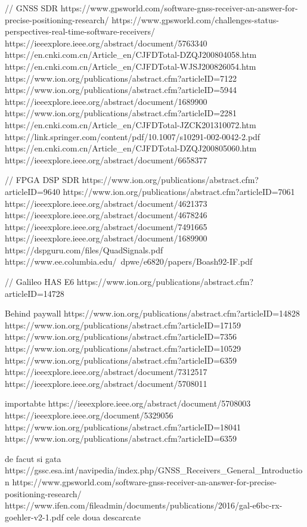 // GNSS SDR
https://www.gpsworld.com/software-gnss-receiver-an-answer-for-precise-positioning-research/
https://www.gpsworld.com/challenges-status-perspectives-real-time-software-receivers/
https://ieeexplore.ieee.org/abstract/document/5763340
https://en.cnki.com.cn/Article_en/CJFDTotal-DZQJ200804058.htm
https://en.cnki.com.cn/Article_en/CJFDTotal-WJSJ200826054.htm
https://www.ion.org/publications/abstract.cfm?articleID=7122
https://www.ion.org/publications/abstract.cfm?articleID=5944
https://ieeexplore.ieee.org/abstract/document/1689900
https://www.ion.org/publications/abstract.cfm?articleID=2281
https://en.cnki.com.cn/Article_en/CJFDTotal-JZCK201310072.htm
https://link.springer.com/content/pdf/10.1007/s10291-002-0042-2.pdf
https://en.cnki.com.cn/Article_en/CJFDTotal-DZQJ200805060.htm
https://ieeexplore.ieee.org/abstract/document/6658377


// FPGA DSP SDR
https://www.ion.org/publications/abstract.cfm?articleID=9640
https://www.ion.org/publications/abstract.cfm?articleID=7061
https://ieeexplore.ieee.org/abstract/document/4621373
https://ieeexplore.ieee.org/abstract/document/4678246
https://ieeexplore.ieee.org/abstract/document/7491665
https://ieeexplore.ieee.org/abstract/document/1689900
https://dspguru.com/files/QuadSignals.pdf
https://www.ee.columbia.edu/~dpwe/e6820/papers/Boash92-IF.pdf


// Galileo HAS E6
https://www.ion.org/publications/abstract.cfm?articleID=14728

Behind paywall
https://www.ion.org/publications/abstract.cfm?articleID=14828
https://www.ion.org/publications/abstract.cfm?articleID=17159
https://www.ion.org/publications/abstract.cfm?articleID=7356
https://www.ion.org/publications/abstract.cfm?articleID=10529
https://www.ion.org/publications/abstract.cfm?articleID=6359
https://ieeexplore.ieee.org/abstract/document/7312517
https://ieeexplore.ieee.org/abstract/document/5708011

importabte
https://ieeexplore.ieee.org/abstract/document/5708003
https://ieeexplore.ieee.org/document/5329056
https://www.ion.org/publications/abstract.cfm?articleID=18041
https://www.ion.org/publications/abstract.cfm?articleID=6359




de facut si gata
https://gssc.esa.int/navipedia/index.php/GNSS_Receivers_General_Introduction
https://www.gpsworld.com/software-gnss-receiver-an-answer-for-precise-positioning-research/
https://www.ifen.com/fileadmin/documents/publications/2016/gal-e6bc-rx-goehler-v2-1.pdf
cele doua descarcate